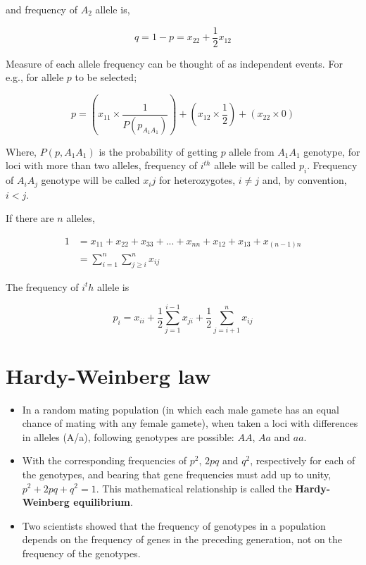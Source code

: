 \documentclass[11pt,dvipsnames,ignorenonframetext,aspectratio=169]{beamer}
\providecommand{\tightlist}{%
  \setlength{\itemsep}{0pt}\setlength{\parskip}{0pt}}
\begin{document}
\begin{frame}{}
\protect\hypertarget{section}{}

and frequency of \(A_2\) allele is,

\[
q = 1-p = x_{22} + \frac{1}{2}x_{12}
\]

Measure of each allele frequency can be thought of as independent
events. For e.g., for allele \(p\) to be selected;

\[
p = \left(x_{11} \times \frac{1}{P(p_{A_1A_1})}\right) + \left(x_{12} \times \frac{1}{2}\right) + (x_{22} \times 0)
\]

Where, \(P(p, A_1A_1)\) is the probability of getting \(p\) allele from
\(A_1A_1\) genotype, for loci with more than two alleles, frequency of
\(i^{th}\) allele will be called \(p_i\). Frequency of \(A_iA_j\)
genotype will be called \(x_ij\) for heterozygotes, \(i\neq j\) and, by
convention, \(i<j\).

\end{frame}

\begin{frame}{}
\protect\hypertarget{section-1}{}

If there are \(n\) alleles,

\[
\begin{aligned}
1 &= x_{11} + x_{22} + x_{33} + ... + x_{nn} + x_{12} + x_{13} + x_{(n-1)n} \\
  &= \sum^n_{i=1}\sum^n_{j\geq i}{x_{ij}}
\end{aligned}
\]

The frequency of \(i^th\) allele is

\[
p_i = x_{ii} + \frac{1}{2}\sum^{i-1}_{j = 1}{x_{ji}} + \frac{1}{2}\sum^n_{j = i+1}{x_{ij}}
\]

\end{frame}

\hypertarget{hardy-weinberg-law}{%
\section{Hardy-Weinberg law}\label{hardy-weinberg-law}}

\begin{frame}{}
\protect\hypertarget{section-2}{}

\begin{itemize}
\tightlist
\item
  In a random mating population (in which each male gamete has an equal
  chance of mating with any female gamete), when taken a loci with
  differences in alleles (A/a), following genotypes are possible:
  \(AA\), \(Aa\) and \(aa\).
\item
  With the corresponding frequencies of \(p^2\), \(2pq\) and \(q^2\),
  respectively for each of the genotypes, and bearing that gene
  frequencies must add up to unity, \(p^2+2pq+q^2 = 1\). This
  mathematical relationship is called the \textbf{Hardy-Weinberg
  equilibrium}.
\item
  Two scientists showed that the frequency of genotypes in a population
  depends on the frequency of genes in the preceding generation, not on
  the frequency of the genotypes.
\end{itemize}

\end{frame}
\end{document}
